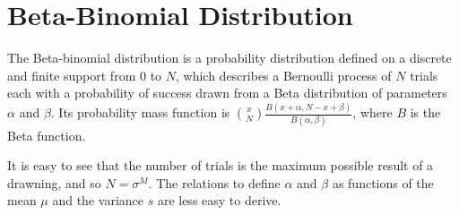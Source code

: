 \documentclass[a4paper, headings=standardclasses]{scrartcl}
\begin{document}




\printbibliography

\appendix

\section{Beta-Binomial Distribution}
\label{sec:beta-binomial}
The Beta-binomial distribution is a probability distribution defined on a discrete and finite support from $0$ to $N$, which describes a Bernoulli process of $N$ trials each with a probability of success drawn from a Beta distribution of parameters $\alpha$ and $\beta$.
Its probability mass function is $\binom{x}{N}\frac{B(x+\alpha, N-x+\beta)}{B(\alpha,\beta)}$, where $B$ is the Beta function.

It is easy to see that the number of trials is the maximum possible result of a drawning, and so $N=\sigma^M$.
The relations to define $\alpha$ and $\beta$ as functions of the mean $\mu$ and the variance $s$ are less easy to derive.
\end{document}
